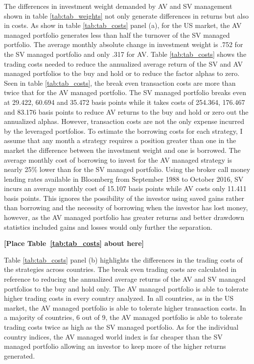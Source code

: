 The differences in investment weight demanded by AV and SV management shown in table \ref{tab:tab_weights} not only generate differences in returns but also in costs. As show in table \ref{tab:tab_costs} panel (a), for the US market, the AV managed portfolio generates less than half the turnover of the SV managed portfolio. The average monthly absolute change in investment weight is .752 for the SV managed portfolio and only .317 for AV. Table \ref{tab:tab_costs} shows the trading costs needed to reduce the annualized average return of the SV and AV managed portfolios to the buy and hold or to reduce the factor alphas to zero. \citep{frazzini_trading_2015,moreira_volatility-managed_2017} Seen in table \ref{tab:tab_costs}, the break even transaction costs are more than twice that for the AV managed portfolio. The SV managed portfolio breaks even at 29.422, 60.694 and 35.472 basis points while it takes costs of 254.364, 176.467 and 83.176 basis points to reduce AV returns to the buy and hold or zero out the annualized alphas. However, transaction costs are not the only expense incurred by the leveraged portfolios. To estimate the borrowing costs for each strategy, I assume that any month a strategy requires a position greater than one in the market the difference between the investment weight and one is borrowed. The average monthly cost of borrowing to invest for the AV managed strategy is nearly 25\% lower than for the SV managed portfolio. Using the broker call money lending rates available in Bloomberg from September 1988 to October 2016, SV incurs an average monthly cost of 15.107 basis points while AV costs only 11.411 basis points. This ignores the possibility of the investor using saved gains rather than borrowing and the necessity of borrowing when the investor has lost money, however, as the AV managed portfolio has greater returns and better drawdown statistics included gains and losses would only further the separation.
\bigskip
\centerline{\bf [Place Table~\ref{tab:tab_costs} about here]}
\bigskip

Table \ref{tab:tab_costs} panel (b) highlights the differences in the trading costs of the strategies across countries. The break even trading costs are calculated in reference to reducing the annualized average returns of the AV and SV managed portfolios to the buy and hold only. The AV managed portfolio is able to tolerate higher trading costs in every country analyzed. In all countries, as in the US market, the AV managed portfolio is able to tolerate higher transaction costs. In a majority of countries, 6 out of 9, the AV managed portfolio is able to tolerate trading costs twice as high as the SV managed portfolio. As for the individual country indices, the AV managed world index is far cheaper than the SV managed portfolio allowing an investor to keep more of the higher returns generated.